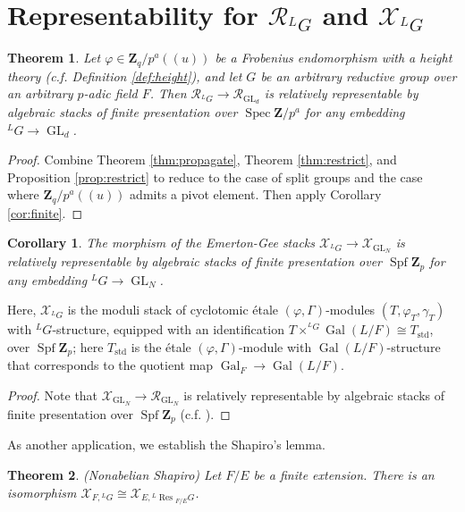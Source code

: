 \documentclass[11pt]{amsart}
\newtheorem{cor}{Corollary}
\newtheorem{thm}{Theorem}
\numberwithin{thm}{section}
\numberwithin{lem}{section}
\numberwithin{cor}{section}
\numberwithin{prop}{section}
\numberwithin{exam}{section}
\numberwithin{dfn}{section}
\newcommand{\std}{\operatorname{std}}
\newcommand{\Gal}{\operatorname{Gal}}
\newcommand{\Res}{\operatorname{Res}}
\newcommand{\GL}{\operatorname{GL}}
\newcommand{\spf}{\operatorname{Spf}}
\newcommand{\spec}{\operatorname{Spec}}
\newcommand{\cX}{\mathcal{X}}
\newcommand{\clR}{\mathcal{R}}
\newcommand{\Z}{\mathbf{Z}}
\newcommand{\lsup}[2]{{^{#1}\!#2}}
\begin{document}
\section{Representability
for $\clR_{\lsup LG}$
and $\cX_{\lsup LG}$}

\begin{thm}
Let $\varphi\in \Z_q/p^a(\!(u)\!)$
be a Frobenius endomorphism with a height theory
(c.f. Definition \ref{def:height}),
and let $G$ be an arbitrary reductive group
over an arbitrary $p$-adic field $F$.
Then $\clR_{\lsup LG}\to\clR_{\GL_d}$
is relatively representable
by algebraic stacks of finite presentation over $\spec \Z/p^a$
for any embedding $\lsup LG\to\GL_d$.
\end{thm}

\begin{proof}
Combine Theorem 
\ref{thm:propagate},
Theorem \ref{thm:restrict},
and Proposition \ref{prop:restrict}
to reduce to the case of split groups
and the case where $\Z_q/p^a(\!(u)\!)$
admits a pivot element.
Then apply Corollary \ref{cor:finite}.
\end{proof}


\begin{cor}
\label{cor:representable}
The morphism of the Emerton-Gee stacks
$\cX_{\lsup LG}\to\cX_{\GL_N}$
is relatively representable
by algebraic stacks of finite presentation over $\spf\Z_p$
for any embedding $\lsup LG\to\GL_N$.
\end{cor}

Here, $\cX_{\lsup LG}$
is the moduli stack of cyclotomic \'etale $(\varphi, \Gamma)$-modules
$(T, \varphi_T, \gamma_T)$
with $\lsup LG$-structure,
equipped with an identification
$T\times^{\lsup LG}\Gal(L/F)\cong
T_{\std}$,
over $\spf \Z_p$;
here $T_{\std}$
is the \'etale $(\varphi, \Gamma)$-module
with $\Gal(L/F)$-structure
that corresponds to
the quotient map $\Gal_F\to\Gal(L/F)$.

\begin{proof}
Note that $\cX_{\GL_N}\to\clR_{\GL_N}$
is relatively representable by
algebraic stacks of finite presentation over $\spf \Z_p$
(c.f. \cite[Proposition 3.4.10]{EG23}).
\end{proof}


As another application,
we establish the Shapiro's lemma.

\begin{thm} (Nonabelian Shapiro)
\label{thm:Sha}
Let $F/E$ be a finite extension.
There is an isomorphism
$\cX_{F, \lsup LG}\cong\cX_{E, \lsup L\Res_{F/E}G}$.
\end{thm}
\end{document}
